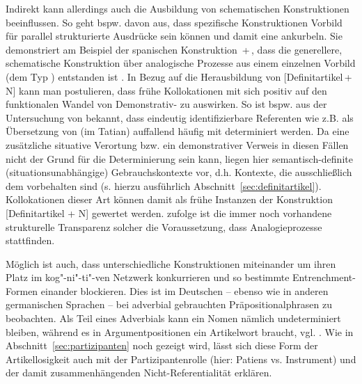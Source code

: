 Indirekt kann allerdings auch  die Ausbildung von schematischen Konstruktionen  beeinflussen. So geht bspw. \textcite[96]{Bybee2010} davon aus, dass spezifische Konstruktionen  Vorbild für parallel strukturierte Ausdrücke sein können und damit eine  ankurbeln. Sie demonstriert am Beispiel der spanischen Konstruktion   \,+\,, dass die generellere, schematische  Konstruktion   über analogische Prozesse  aus einem einzelnen Vorbild (dem Typ ) entstanden ist \parencite[72]{Bybee2010}. In Bezug auf die Herausbildung von [Definitartikel\,+\,N] kann man postulieren, dass frühe Kollokationen mit  sich positiv auf den funktionalen Wandel von Demonstrativ-  zu  auswirken. So ist bspw. aus der Untersuchung von \textcite{Oubouzar1992} bekannt, dass eindeutig identifizierbare Referenten wie  z.B.  als Übersetzung von  (im Tatian) auffallend häufig mit  determiniert werden. Da eine zusätzliche situative  Verortung bzw. ein demonstrativer Verweis in diesen Fällen nicht der Grund für die Determinierung sein kann, liegen hier semantisch-definite   (situationsunabhängige) Gebrauchskontexte vor, d.h. Kontexte, die ausschließlich dem  vorbehalten sind (s. hierzu ausführlich Abschnitt~\ref{sec:definitartikel}). Kollokationen dieser Art können damit als frühe Instanzen der Konstruktion   [Definitartikel + N] gewertet werden. \textcite[96]{Bybee2010} zufolge ist die immer noch vorhandene strukturelle Transparenz solcher  die Voraussetzung, dass Analogieprozesse  stattfinden.   

Möglich ist auch, dass unterschiedliche Konstruktionen miteinander um ihren Platz im kog"-ni"-ti"-ven Netzwerk konkurrieren und so bestimmte Entrenchment-Formen  einander blockieren. Dies ist im Deutschen -- ebenso wie in anderen germanischen Sprachen \parencite[s.][]{Himmelmann1998} -- bei adverbial  gebrauchten Präpositionalphrasen  zu beobachten. Als Teil eines Adverbials  kann ein Nomen nämlich undeterminiert bleiben, während es in Argumentpositionen ein Artikelwort braucht, vgl. . Wie in Abschnitt~\ref{sec:partizipanten} noch gezeigt wird, lässt sich diese Form der Artikellosigkeit auch mit der Partizipantenrolle 
 (hier: Patiens vs. Instrument) und der damit zusammenhängenden Nicht-Referentialität  erklären.  

